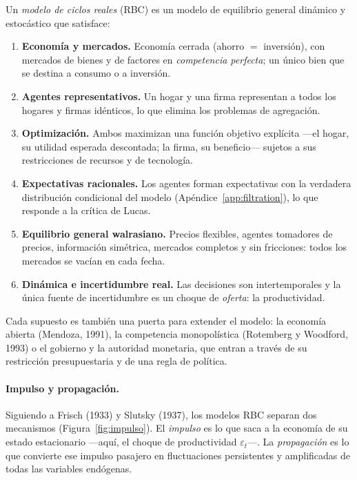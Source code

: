 \documentclass[11pt,a4paper]{report}
\newcounter{tcbdef}[section]
\renewcommand{\thetcbdef}{\thesection.\arabic{tcbdef}}
\newenvironment{definition}[1][]{%
  \refstepcounter{tcbdef}%
  \begin{tcolorbox}[defstyle, title={Definición~\thetcbdef%
    \ifx\relax#1\relax\else\ (#1)\fi}]}%
{\end{tcolorbox}}
\begin{document}
\begin{definition}[Modelo RBC canónico]
Un \emph{modelo de ciclos reales} (RBC) es un modelo de equilibrio general dinámico y
estocástico que satisface:
\begin{enumerate}[label=(\roman*), leftmargin=2em, itemsep=1pt, topsep=2pt]
\item \textbf{Economía y mercados.} Economía cerrada (ahorro $=$ inversión), con
  mercados de bienes y de factores en \emph{competencia perfecta}; un único bien que
  se destina a consumo o a inversión.
\item \textbf{Agentes representativos.} Un hogar y una firma representan a todos los
  hogares y firmas idénticos, lo que elimina los problemas de agregación.
\item \textbf{Optimización.} Ambos maximizan una función objetivo explícita ---el hogar,
  su utilidad esperada descontada; la firma, su beneficio--- sujetos a sus
  restricciones de recursos y de tecnología.
\item \textbf{Expectativas racionales.} Los agentes forman expectativas con la
  verdadera distribución condicional del modelo (Apéndice~\ref{app:filtration}), lo
  que responde a la crítica de Lucas.
\item \textbf{Equilibrio general walrasiano.} Precios flexibles, agentes tomadores de
  precios, información simétrica, mercados completos y sin fricciones: todos los
  mercados se vacían en cada fecha.
\item \textbf{Dinámica e incertidumbre real.} Las decisiones son intertemporales y la
  única fuente de incertidumbre es un choque de \emph{oferta}: la productividad.
\end{enumerate}
\end{definition}

\noindent Cada supuesto es también una puerta para extender el modelo: la economía
abierta (Mendoza, 1991), la competencia monopolística (Rotemberg y Woodford, 1993) o
el gobierno y la autoridad monetaria, que entran a través de su restricción
presupuestaria y de una regla de política.

\paragraph{Impulso y propagación.} Siguiendo a Frisch (1933) y Slutsky (1937), los
modelos RBC separan dos mecanismos (Figura~\ref{fig:impulso}). El \emph{impulso} es lo
que saca a la economía de su estado estacionario ---aquí, el choque de productividad
$\varepsilon_t$---. La \emph{propagación} es lo que convierte ese impulso pasajero en
fluctuaciones persistentes y amplificadas de todas las variables endógenas.
\end{document}
